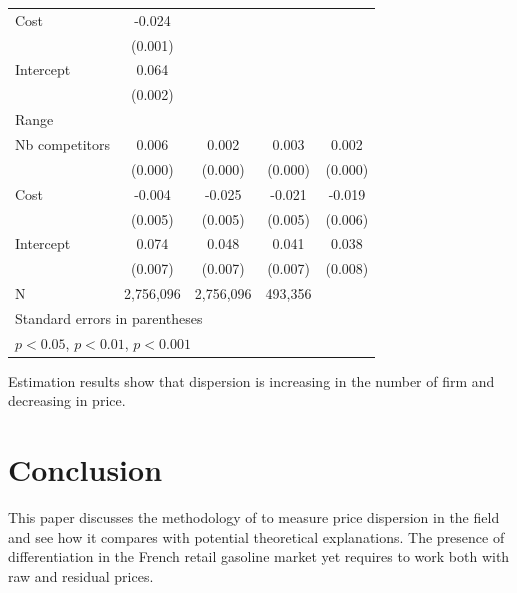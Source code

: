\documentclass[11pt]{article}
\begin{document}
\begin{table}[H]
\begin{tabular}{lcccc}
Cost                     & -0.024\sym{***}  &        \sym{}    &       \sym{}     &\\
{}                       & (0.001)          &                  &                  &\\
Intercept                &  0.064\sym{***}  &        \sym{}    &       \sym{}     &\\
{}                       & (0.002)          &                  &                  &\\
\hline
Range & & & & \\
\hline
Nb competitors           &  0.006\sym{***}  &  0.002\sym{***}  &  0.003\sym{***}  &  0.002\sym{***} \\
{}                       & (0.000)          & (0.000)          & (0.000)          & (0.000)         \\
Cost                     & -0.004\sym{}     & -0.025\sym{***}  & -0.021\sym{***}  & -0.019\sym{***} \\
{}                       & (0.005)          & (0.005)          & (0.005)          & (0.006)         \\
Intercept                &  0.074\sym{***}  & 0.048\sym{***}   &  0.041\sym{***}  &  0.038\sym{***} \\
{}                       & (0.007)          & (0.007)          & (0.007)          & (0.008)         \\
\hline
N                        & 2,756,096        & 2,756,096        & 493,356          &\\
\hline\hline
\multicolumn{4}{l}{\footnotesize Standard errors in parentheses}\\
\multicolumn{4}{l}{\footnotesize \sym{*} \(p<0.05\), \sym{**} \(p<0.01\), \sym{***} \(p<0.001\)}\\
\end{tabular}
\end{table}

Estimation results show that dispersion is increasing in the number of firm and decreasing in price.

\section{Conclusion}

This paper discusses the methodology of \cite{TAP11} to measure price dispersion in the field and see how it compares with potential theoretical explanations. The presence of differentiation in the French retail gasoline market yet requires to work both with raw and residual prices.
\end{document}
